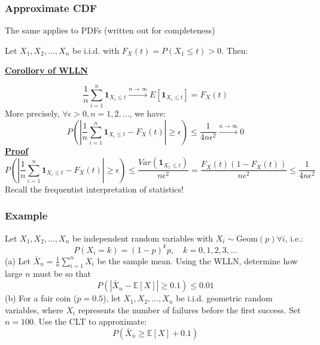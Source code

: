 \documentclass[t,8pt]{beamer}%
\begin{document}
\begin{frame}
    \frametitle{Approximate CDF}
    The same applies to PDFs (written out for completeness) \par
    Let $X_1,X_2,\dots,X_n$ be i.i.d. with $F_X(t)=P(X_1\leq t)>0$. Then: \par
    {\bf\underline{Corollory of WLLN}} \par
    $$\frac 1n\sum_{i=1}^n\mathbf 1_{X_i\leq t}\xrightarrow{n\rightarrow\infty} E[\mathbf 1_{X_i\leq t}]=F_X(t)$$
    More precisely, $\forall\epsilon>0,n=1,2,\dots$, we have:
    $$P\left(\left|\frac 1n\sum_{i=1}^n\mathbf 1_{X_i\leq t}-F_X(t)\right|\geq\epsilon\right)\leq\frac{1}{4n\epsilon^2}\xrightarrow{n\rightarrow\infty}0$$
    {\bf\underline{Proof}}
    $$P\left(\left|\frac 1n\sum_{i=1}^n\mathbf 1_{X_i\leq t}-F_X(t)\right|\geq\epsilon\right)\leq\frac{Var(\mathbf 1_{X_1\leq t})}{n\epsilon^2}=\frac{F_X(t)(1-F_X(t))}{n\epsilon^2}\leq\frac{1}{4n\epsilon^2}$$
    Recall the frequentist interpretation of statistics!
\end{frame}

\begin{frame}
    \frametitle{Example}
    Let \( X_1, X_2, \dots, X_n \) be independent random variables with \(X_i \sim \text{Geom}(p)\forall i\), i.e.:
\[
P(X_i = k) = (1 - p)^k p, \quad k = 0,1,2,3, \dots
\]
(a) Let \( \bar{X}_n = \frac{1}{n} \sum_{i=1}^{n} X_i \) be the sample mean. Using the WLLN, determine how large \( n \) must be so that 
\[
P(|\bar{X}_n - \mathbb{E}[X]| \geq 0.1) \leq 0.01
\]
\color{gray}
(b) For a fair coin (\( p = 0.5 \)), let \( X_1, X_2, \dots, X_n \) be i.i.d. geometric random variables, where \( X_i \) represents the number of failures before the first success. Set \( n = 100 \). Use the CLT to approximate:
\[
P(\bar{X}_n \geq \mathbb{E}[X] + 0.1)
\]
\color{black}
\end{frame}
\end{document}
